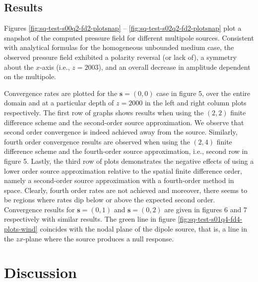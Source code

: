 \subsection{Results}


Figures \ref{fig:sq-test-s00q2-fd2-plotsnap} -- \ref{fig:sq-test-s02q2-fd2-plotsnap} 
plot a snapshot of the computed pressure field for different multipole sources.
Consistent with analytical formulas for the homogeneous unbounded medium case, 
the observed pressure field exhibited a polarity reversal (or lack of), a symmetry about the $x$-axis (i.e., $z=2003$), and an overall decrease in amplitude dependent on the multipole.


Convergence rates are plotted for the $\mathbf s=(0,0)$ case in figure 5, 
over the entire domain and at a particular depth of $z=2000$ in the left and right column plots respectively.
The first row of graphs shows results when using the $(2,2)$ finite difference scheme and the second-order source approximation.
We observe that second order convergence is indeed achieved away from the source.
Similarly, fourth order convergence results are observed when using the $(2,4)$ finite difference scheme and the fourth-order source approximation, i.e., second row in figure 5.
Lastly, the third row of plots demonstrates the negative effects of using a lower order source approximation relative to the spatial finite difference order, namely a second-order source approximation with a fourth-order method in space.
Clearly, fourth order rates are not achieved and moreover, there seems to be regions 
where rates dip below or above the expected second order.
Convergence results for $\mathbf s=(0,1)$ and $\mathbf s=(0,2)$ are given in figures 6 and 7 respectively with similar results.
The green line in figure \ref{fig:sq-test-s01q4-fd4-plots-wind} coincides with the nodal plane of the dipole source, that is, a line in the $zx$-plane where the source produces a null response. 

\section{Discussion}

